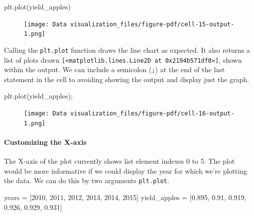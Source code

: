 \documentclass[
  letterpaper,
  DIV=11,
  numbers=noendperiod]{scrreprt}
\let\oldparagraph\paragraph
\renewcommand{\paragraph}[1]{\oldparagraph{#1}\mbox{}}
\newenvironment{Shaded}{\begin{snugshade}}{\end{snugshade}}
\newcommand{\DecValTok}[1]{\textcolor[rgb]{0.68,0.00,0.00}{#1}}
\newcommand{\FloatTok}[1]{\textcolor[rgb]{0.68,0.00,0.00}{#1}}
\newcommand{\NormalTok}[1]{\textcolor[rgb]{0.00,0.23,0.31}{#1}}
\newcommand{\OperatorTok}[1]{\textcolor[rgb]{0.37,0.37,0.37}{#1}}
\begin{document}
\begin{Shaded}
\begin{Highlighting}[]
\NormalTok{plt.plot(yield\_apples)}
\end{Highlighting}
\end{Shaded}

\begin{figure}[H]

{\centering \texttt{[image: Data visualization\_files/figure-pdf/cell-15-output-1.png]}

}

\end{figure}

Calling the \texttt{plt.plot} function draws the line chart as expected.
It also returns a list of plots drawn
\texttt{{[}\textless{}matplotlib.lines.Line2D\ at\ 0x2194b571df0\textgreater{}{]}},
shown within the output. We can include a semicolon (\texttt{;}) at the
end of the last statement in the cell to avoiding showing the output and
display just the graph.

\begin{Shaded}
\begin{Highlighting}[]
\NormalTok{plt.plot(yield\_apples)}\OperatorTok{;}
\end{Highlighting}
\end{Shaded}

\begin{figure}[H]

{\centering \texttt{[image: Data visualization\_files/figure-pdf/cell-16-output-1.png]}

}

\end{figure}

\hypertarget{customizing-the-x-axis}{%
\paragraph{Customizing the X-axis}\label{customizing-the-x-axis}}

The X-axis of the plot currently shows list element indexes 0 to 5. The
plot would be more informative if we could display the year for which
we're plotting the data. We can do this by two arguments
\texttt{plt.plot}.

\begin{Shaded}
\begin{Highlighting}[]
\NormalTok{years }\OperatorTok{=}\NormalTok{ [}\DecValTok{2010}\NormalTok{, }\DecValTok{2011}\NormalTok{, }\DecValTok{2012}\NormalTok{, }\DecValTok{2013}\NormalTok{, }\DecValTok{2014}\NormalTok{, }\DecValTok{2015}\NormalTok{]}
\NormalTok{yield\_apples }\OperatorTok{=}\NormalTok{ [}\FloatTok{0.895}\NormalTok{, }\FloatTok{0.91}\NormalTok{, }\FloatTok{0.919}\NormalTok{, }\FloatTok{0.926}\NormalTok{, }\FloatTok{0.929}\NormalTok{, }\FloatTok{0.931}\NormalTok{]}
\end{Highlighting}
\end{Shaded}
\end{document}
